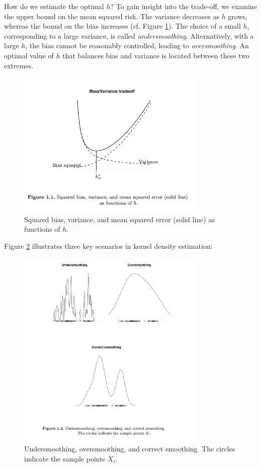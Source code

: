 \documentclass{article}
\begin{document}
How do we estimate the optimal $h$? To gain insight into the trade-off, we examine the upper bound on the mean squared risk. The variance decreases as $h$ grows, whereas the bound on the bias increases (cf. Figure \ref{fig:tradeoff}). The choice of a small $h$, corresponding to a large variance, is called \textit{undersmoothing}. Alternatively, with a large $h$, the bias cannot be reasonably controlled, leading to \textit{oversmoothing}. An optimal value of $h$ that balances bias and variance is located between these two extremes.

\begin{figure}[h]
    \centering
    \includegraphics[width=0.8\textwidth]{trade_off_nonparametrics.png} %
    \caption{Squared bias, variance, and mean squared error (solid line) as functions of $h$.}
    \label{fig:tradeoff}
\end{figure}

Figure \ref{fig:smoothing_graphs} illustrates three key scenarios in kernel density estimation:
\begin{figure}[h]
    \centering
    \includegraphics[width=0.8\textwidth]{graphs_1_nonparametrics.png} %
    \caption{Undersmoothing, oversmoothing, and correct smoothing. The circles indicate the sample points $X_i$.}
    \label{fig:smoothing_graphs}
\end{figure}
\end{document}
